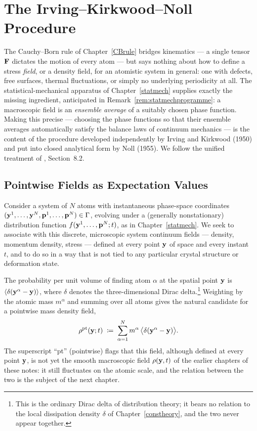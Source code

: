\chapter{The Irving--Kirkwood--Noll Procedure}\label{IKN}

The Cauchy--Born rule of Chapter~\ref{CBrule} bridges kinematics --- a single tensor $\mathbf{F}$ dictates the motion of every atom --- but says nothing about how to define a stress \textit{field}, or a density field, for an atomistic system in general: one with defects, free surfaces, thermal fluctuations, or simply no underlying periodicity at all. The statistical-mechanical apparatus of Chapter~\ref{statmech} supplies exactly the missing ingredient, anticipated in Remark~\ref{rem:statmechprogramme}: a macroscopic field is an \textit{ensemble average} of a suitably chosen phase function. Making this precise --- choosing the phase functions so that their ensemble averages automatically satisfy the balance laws of continuum mechanics --- is the content of the procedure developed independently by Irving and Kirkwood (1950) and put into closed analytical form by Noll (1955). We follow the unified treatment of \cite{TadmorMiller}, Section~8.2.

\section{Pointwise Fields as Expectation Values}

Consider a system of $N$ atoms with instantaneous phase-space coordinates $(\mathbf{y}^1,\ldots,\mathbf{y}^N,\mathbf{p}^1,\ldots,\mathbf{p}^N)\in\Gamma$, evolving under a (generally nonstationary) distribution function $f(\mathbf{y}^1,\ldots,\mathbf{p}^N;t)$, as in Chapter~\ref{statmech}. We seek to associate with this discrete, microscopic system continuum fields --- density, momentum density, stress --- defined at every point $\mathbf{y}$ of space and every instant $t$, and to do so in a way that is not tied to any particular crystal structure or deformation state.

The probability per unit volume of finding atom $\alpha$ at the spatial point $\mathbf{y}$ is $\langle\delta(\mathbf{y}^\alpha-\mathbf{y})\rangle$, where $\delta$ denotes the three-dimensional Dirac delta.\footnote{This is the ordinary Dirac delta of distribution theory; it bears no relation to the local dissipation density $\delta$ of Chapter~\ref{constheory}, and the two never appear together.} Weighting by the atomic mass $m^\alpha$ and summing over all atoms gives the natural candidate for a pointwise mass density field,
\begin{equation}\label{rhopt}
	\rho^{\rm pt}(\mathbf{y};t) \;\coloneqq\; \sum_{\alpha=1}^N m^\alpha\,\big\langle\delta(\mathbf{y}^\alpha-\mathbf{y})\big\rangle.
\end{equation}
The superscript ``pt'' (pointwise) flags that this field, although defined at every point $\mathbf{y}$, is not yet the smooth macroscopic field $\rho(\mathbf{y},t)$ of the earlier chapters of these notes: it still fluctuates on the atomic scale, and the relation between the two is the subject of the next chapter.

